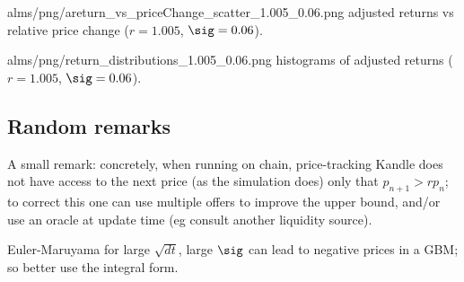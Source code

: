 \documentclass[oneside,12pt]{article}
\begin{document}
\IG{420pt}
{alms/png/areturn_vs_priceChange_scatter_1.005_0.06.png}
{\label{1.005-0.06ar} adjusted returns vs relative price change ($r=1.005$, $\sig=0.06$).}

\IG{420pt}
{alms/png/return_distributions_1.005_0.06.png}
{\label{1.005-0.06h} histograms of adjusted returns ($r=1.005$, $\sig=0.06$).}

\subsection{Random remarks}

A small remark: concretely, when running on chain, price-tracking Kandle does not have access to the next price (as the simulation does)
only that $p_{n+1}>r p_n$;
to correct this one can use multiple offers to improve the upper bound,
and/or use an oracle at update time (eg consult another liquidity source).

Euler-Maruyama for large $\sqrt{dt}$, large $\sig$ can lead to negative prices in a GBM;
so better use the integral form. 
\end{document}
